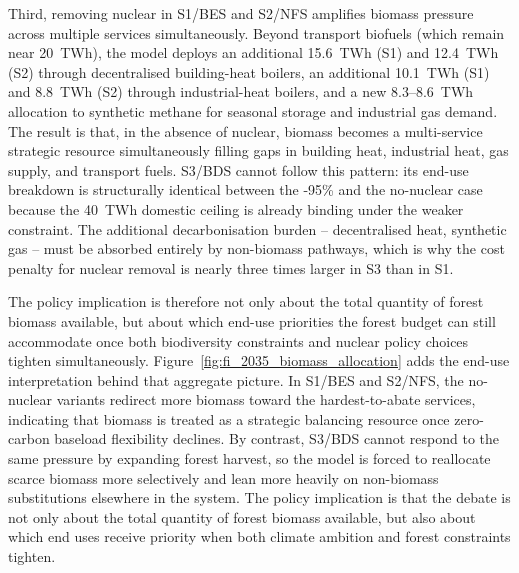 \documentclass{article}
\begin{document}
Third, removing nuclear in S1/BES and S2/NFS amplifies biomass pressure across multiple services simultaneously. Beyond transport biofuels (which remain near 20~TWh), the model deploys an additional 15.6~TWh (S1) and 12.4~TWh (S2) through decentralised building-heat boilers, an additional 10.1~TWh (S1) and 8.8~TWh (S2) through industrial-heat boilers, and a new 8.3--8.6~TWh allocation to synthetic methane for seasonal storage and industrial gas demand. The result is that, in the absence of nuclear, biomass becomes a multi-service strategic resource simultaneously filling gaps in building heat, industrial heat, gas supply, and transport fuels. S3/BDS cannot follow this pattern: its end-use breakdown is structurally identical between the -95\% and the no-nuclear case because the 40~TWh domestic ceiling is already binding under the weaker constraint. The additional decarbonisation burden -- decentralised heat, synthetic gas -- must be absorbed entirely by non-biomass pathways, which is why the cost penalty for nuclear removal is nearly three times larger in S3 than in S1.

The policy implication is therefore not only about the total quantity of forest biomass available, but about which end-use priorities the forest budget can still accommodate once both biodiversity constraints and nuclear policy choices tighten simultaneously.
Figure~\ref{fig:fi_2035_biomass_allocation} adds the end-use interpretation behind that aggregate picture. In S1/BES and S2/NFS, the no-nuclear variants redirect more biomass toward the hardest-to-abate services, indicating that biomass is treated as a strategic balancing resource once zero-carbon baseload flexibility declines. By contrast, S3/BDS cannot respond to the same pressure by expanding forest harvest, so the model is forced to reallocate scarce biomass more selectively and lean more heavily on non-biomass substitutions elsewhere in the system. The policy implication is that the debate is not only about the total quantity of forest biomass available, but also about which end uses receive priority when both climate ambition and forest constraints tighten.
\end{document}
